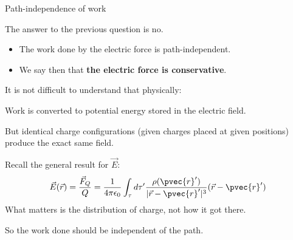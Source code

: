 %
%
%

\begin{frame}{Path-independence of work}

The answer to the previous question is no.
\begin{itemize}
 \item The work done by the electric force is path-independent.\\
 \item We say then that {\bf the electric force is conservative}.\\
\end{itemize}

\vspace{0.3cm}

It is not difficult to understand that physically:
\begin{itemize}
{\small
 \item Work is converted to potential energy
       stored in the electric field.
 \item But identical charge configurations (given charges placed at given positions)
       produce the exact same field.
 \item Recall the general result for $\vec{E}$:
       \begin{equation*}
         \vec{E}(\vec{r}) = \frac{\vec{F}_{Q}}{Q} = \frac{1}{4\pi\epsilon_0} \int_{\tau}
            d\tau^{\prime} \frac{\rho({\pvec{r}'})}{|\vec{r}-\pvec{r}'|^{3}} (\vec{r}-\pvec{r}')
       \end{equation*}
       What matters is the distribution of charge, not how it got there.
 \item So the work done should be independent of the path.
}
\end{itemize}

\end{frame}

%
%
%

